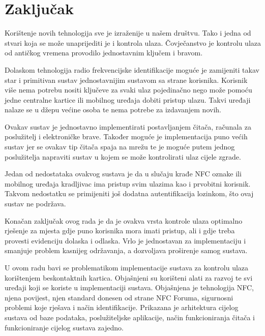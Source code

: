 \documentclass[times, utf8, zavrsni]{fer}
\begin{document}
\chapter{Zaključak}
Korištenje novih tehnologija sve je izraženije u našem društvu. Tako i jedna od stvari koja se može unaprijediti je i kontrola ulaza. Čovječanstvo je kontrolu ulaza od antičkog vremena provodilo jednostavnim ključem i bravom.\par
Dolaskom tehnologija radio frekvencijske identifikacije moguće je zamijeniti takav star i primitivan sustav jednostavnijim sustavom sa strane korisnika. Korisnik više nema potrebu nositi ključeve za svaki ulaz pojedinačno nego može pomoću jedne centralne kartice ili mobilnog uređaja dobiti pristup ulazu. Takvi uređaji nalaze se u džepu većine osoba te nema potrebe za izdavanjem novih.\par
Ovakav sustav je jednostavno implementirati postavljanjem čitača, računala za poslužitelj i elektroničke brave. Također moguće je implementacija puno većih sustav jer se ovakav tip čitača spaja na mrežu te je moguće putem jednog poslužitelja napraviti sustav u kojem se može kontrolirati ulaz cijele zgrade.\par
Jedan od nedostataka ovakvog sustava je da u slučaju krađe NFC oznake ili mobilnog uređaja kradljivac ima pristup svim ulazima kao i prvobitni korisnik. Takvom nedostatku se primijeniti još dodatna autentifikacija lozinkom, što ovaj sustav ne podržava.\par
Konačan zaključak ovog rada je da je ovakva vrsta kontrole ulaza optimalno rješenje za mjesta gdje puno korisnika mora imati pristup, ali i gdje treba provesti evidenciju dolaska i odlaska. Vrlo je jednostavan za implementaciju i smanjuje problem kasnijeg održavanja, a dozvoljava proširenje samog sustava.





\begin{sazetak}
U ovom radu bavi se problematikom implementacije sustava za kontrolu ulaza korištenjem beskontaktnih kartica. Objašnjeni su korišteni alati za razvoj te svi uređaji koji se koriste u implementaciji sustava. Objašnjena je tehnologija NFC, njena povijest, njen standard donesen od strane NFC Foruma, sigurnosni problemi koje rješava i način identifikacije. Prikazana je arhitektura cijelog sustava od baze podataka, poslužiteljske aplikacije, način funkcioniranja čitača i funkcioniranje cijelog sustava zajedno.

\end{sazetak}
\end{document}
